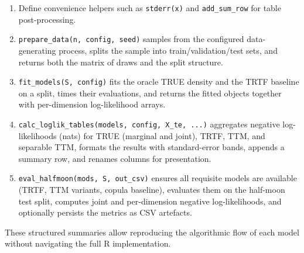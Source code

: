 \documentclass[11pt,a4paper,twoside]{book}\usepackage[]{graphicx}\usepackage[]{xcolor}
\begin{document}
\begin{enumerate}
  \item Define convenience helpers such as \texttt{stderr(x)} and \texttt{add\_sum\_row} for table post-processing.
  \item \texttt{prepare\_data(n, config, seed)} samples from the configured data-generating process, splits the sample into train/validation/test sets, and returns both the matrix of draws and the split structure.
  \item \texttt{fit\_models(S, config)} fits the oracle TRUE density and the TRTF baseline on a split, times their evaluations, and returns the fitted objects together with per-dimension log-likelihood arrays.
  \item \texttt{calc\_loglik\_tables(models, config, X\_te, ...)} aggregates negative log-likelihoods (nats) for TRUE (marginal and joint), TRTF, TTM, and separable TTM, formats the results with standard-error bands, appends a summary row, and renames columns for presentation.
  \item \texttt{eval\_halfmoon(mods, S, out\_csv)} ensures all requisite models are available (TRTF, TTM variants, copula baseline), evaluates them on the half-moon test split, computes joint and per-dimension negative log-likelihoods, and optionally persists the metrics as CSV artefacts.
\end{enumerate}

These structured summaries allow reproducing the algorithmic flow of each model without navigating the full R implementation.
\end{document}
